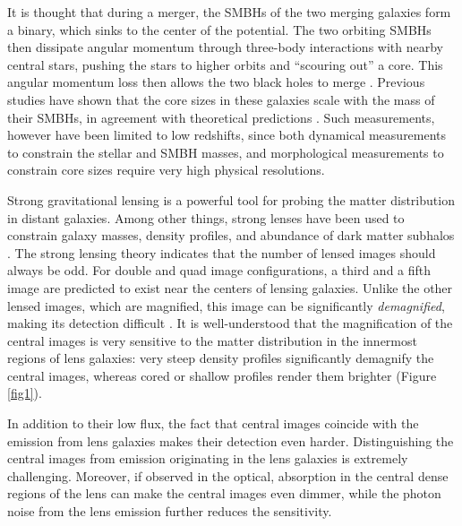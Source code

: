 \documentclass[chicago]{emulateapj}
\begin{document}
It is thought that during a merger, the SMBHs of the two merging galaxies form a binary, which sinks to the center of the potential. The two orbiting SMBHs then dissipate angular momentum through three-body interactions with nearby central stars, pushing the stars to higher orbits and ``scouring out'' a core. This angular momentum loss then allows the two black holes to merge \citep{Begelman:80}.
Previous studies have shown that the core sizes in these galaxies scale with the mass of their SMBHs, in agreement with theoretical predictions \citep{Kormendy:09,Kormendy:13}.
Such measurements, however have been limited to low redshifts, since both dynamical measurements to constrain the stellar and SMBH masses, and morphological measurements to constrain core sizes require very high physical resolutions. 

Strong gravitational lensing is a powerful tool for probing the matter distribution in distant galaxies. Among other things, strong lenses have been used to constrain galaxy masses, density profiles, and abundance of dark matter subhalos \citep[e.g.][]{dalal:02, Gavazzi:07, Bolton:08}. The strong lensing theory indicates that the number of lensed images should always be odd. For double and quad image configurations, a third and a fifth image are predicted to exist near the centers of lensing galaxies. Unlike the other lensed images, which are magnified, this image can be significantly \emph{demagnified}, making its detection difficult \citep[e.g.,][]{Jackson:13}.  It is well-understood that the magnification of the central images is very sensitive to the matter distribution in the innermost regions of lens galaxies: very steep density profiles significantly demagnify the central images, whereas cored or shallow profiles render them brighter (Figure \ref{fig1}). %

In addition to their low flux, the fact that central images coincide with the emission from lens galaxies makes their detection even harder. Distinguishing the central images from emission originating in the lens galaxies is extremely challenging.
Moreover, if observed in the optical, absorption in the central dense regions of the lens can make the central images even dimmer, while the photon noise from the lens emission further reduces the sensitivity. 
\end{document}
